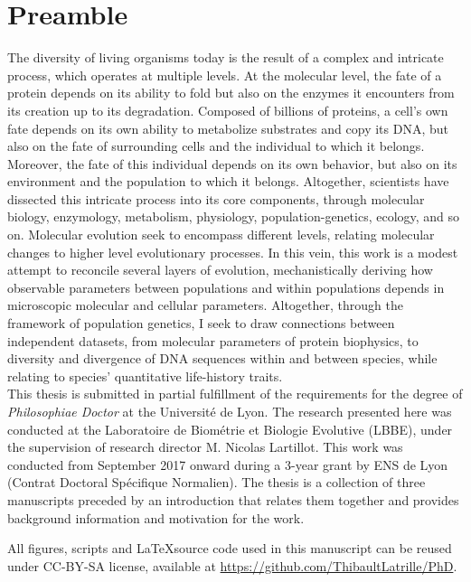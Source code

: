\chapter*{Preamble}
The diversity of living organisms today is the result of a complex and intricate process, which operates at multiple levels.
At the molecular level, the fate of a protein depends on its ability to fold but also on the enzymes it encounters from its creation up to its degradation.
Composed of billions of proteins, a cell's own fate depends on its own ability to metabolize substrates and copy its \acrshort{DNA}, but also on the fate of surrounding cells and the individual to which it belongs.
Moreover, the fate of this individual depends on its own behavior, but also on its environment and the population to which it belongs.
Altogether, scientists have dissected this intricate process into its core components, through molecular biology, enzymology, metabolism, physiology, population-genetics, ecology, and so on.
Molecular evolution seek to encompass different levels, relating molecular changes to higher level evolutionary processes.
In this vein, this work is a modest attempt to reconcile several layers of evolution, mechanistically deriving how observable parameters between populations and within populations depends in microscopic molecular and cellular parameters.
Altogether, through the framework of population genetics, I seek to draw connections between independent datasets, from molecular parameters of protein biophysics, to diversity and divergence of \acrshort{DNA} sequences within and between species, while relating to species' quantitative life-history traits.\\

This thesis is submitted in partial fulfillment of the requirements for the degree of \emph{Philosophiae Doctor} at the Université de Lyon.
The research presented here was conducted at the Laboratoire de Biométrie et Biologie Evolutive (LBBE), under the supervision of research director M. Nicolas Lartillot.
This work was conducted from September 2017 onward during a 3-year grant by ENS de Lyon (Contrat Doctoral Spécifique Normalien).
The thesis is a collection of three manuscripts preceded by an introduction that relates them together and provides background information and motivation for the work.

All figures, scripts and \LaTeX source code used in this manuscript can be reused under CC-BY-SA license, available at \url{https://github.com/ThibaultLatrille/PhD}.